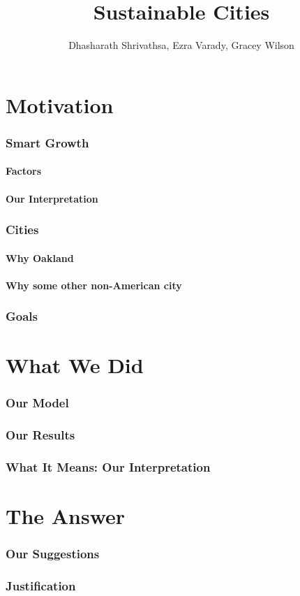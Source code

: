 \documentclass[]{report}
\title{Sustainable Cities}
\author{Dhasharath Shrivathsa, Ezra Varady, Gracey Wilson}
\begin{document}
\maketitle
\tableofcontents

\begin{abstract}
	
\end{abstract}


\part{Motivation}
	\section{Smart Growth}
		\subsection{Factors}
		\subsection{Our Interpretation}
	
	\section{Cities}
		\subsection{Why Oakland}
		\subsection{Why some other non-American city}

	\section{Goals}
	
\part{What We Did}
	\section{Our Model}
	\section{Our Results}
	\section{What It Means: Our Interpretation}
	
\part{The Answer}
	\section{Our Suggestions}
	\section{Justification}
	
\end{document}
